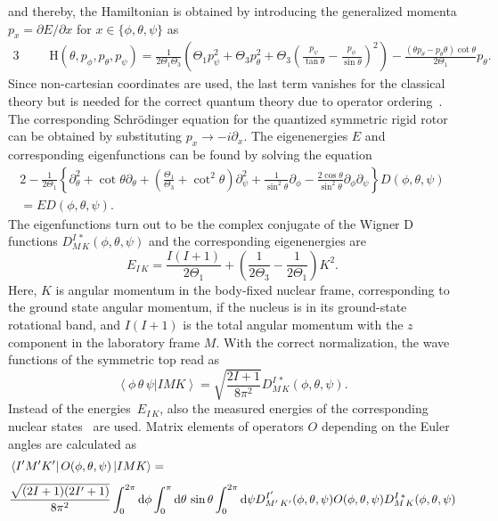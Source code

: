 and thereby, the Hamiltonian is obtained by introducing the generalized momenta $p_x=\partial E / \partial x$ for $x\in \{ \phi,\theta,\psi\}$ as
\begin{alignat}{3}
&&&\mathrm{H}(\theta,p_\phi,p_\theta,p_\psi)=\frac{1}{2\Theta_1 \Theta_3}\left( \Theta_1 p^2_\psi + \Theta_3 p^2_\theta + \Theta_3 \left( \frac{p_\psi}{\tan\theta} - \frac{p_\phi}{\sin\theta} \right)^2 \right)
-\frac{(\theta p_\theta - p_\theta \theta)\cot\theta }{2\Theta_1}p_\theta.
\end{alignat}
Since non-cartesian coordinates are used, the last term vanishes for the classical theory but is needed for the correct quantum theory due to operator ordering~\cite{podolsky1928}.
The corresponding Schrödinger equation for the quantized symmetric rigid rotor can be obtained by substituting $p_x \rightarrow -i\partial_x$. The eigenenergies $E$ and corresponding eigenfunctions can be found by solving the equation~\cite{edmonds1960}
\begin{alignat}{2}
-\frac{1}{2\Theta_1}\left\{ \partial^2_\theta + \cot\theta \partial_\theta+\left(\frac{\Theta_1}{\Theta_3}+\cot^2\theta\right)\partial_\psi^2+\frac{1}{\sin^2\theta}\partial_\phi-\frac{2\cos\theta}{\sin^2\theta}\partial_\phi\partial_\psi\right\} D(\phi,\theta,\psi)\\[4pt] = E D(\phi,\theta,\psi).
\end{alignat}
The eigenfunctions turn out to be the complex conjugate of the Wigner D functions $D^{I\,*}_{M\,K}(\phi,\theta,\psi)$ and the corresponding eigenenergies are~\cite{kronig1927}
\begin{equation}
E_{I\,K}=\frac{I(I+1)}{2\Theta_1}+ \left(\frac{1}{2\Theta_3}-\frac{1}{2\Theta_1}\right)K^2.
\label{eq:rig_rotorEn}
\end{equation}
Here, $K$ is angular momentum in the body-fixed nuclear frame, corresponding to the ground state angular momentum, if the nucleus is in its ground-state rotational band, and $I(I+1)$ is the total angular momentum with the $z$ component in the laboratory frame $M$. With the correct normalization, the wave functions of the symmetric top read as
\begin{equation}
\left<\phi\,\theta\,\psi|IMK\right> = \sqrt{\frac{2I+1}{8\pi^2}}D^{I\,*}_{M\,K}(\phi,\theta,\psi).
\end{equation}
Instead of the energies~$E_{I\,K}$, also the measured energies of the corresponding nuclear states~\cite{ENSDF} are used. Matrix elements of operators $O$ depending on the Euler angles are calculated as
\begin{alignat}{2}
&\left< I^{\prime}M^{\prime}K^{\prime} \right|O(\phi,\theta,\psi)\left|IMK\right>=\\[4pt]
&
\frac{\sqrt{(2I+1)(2I^{\prime}+1)}}{8\pi^2}
\int_0^{2\pi}\text{d}\phi \int_0^{\pi}\text{d}\theta\,\sin\theta \int_0^{2\pi}\text{d}\psi
D^{I^{\prime}}_{M^{\prime}\,K^{\prime}}(\phi,\theta,\psi)O(\phi,\theta,\psi) D^{I\,*}_{M\,K}(\phi,\theta,\psi)\notag
\end{alignat}
